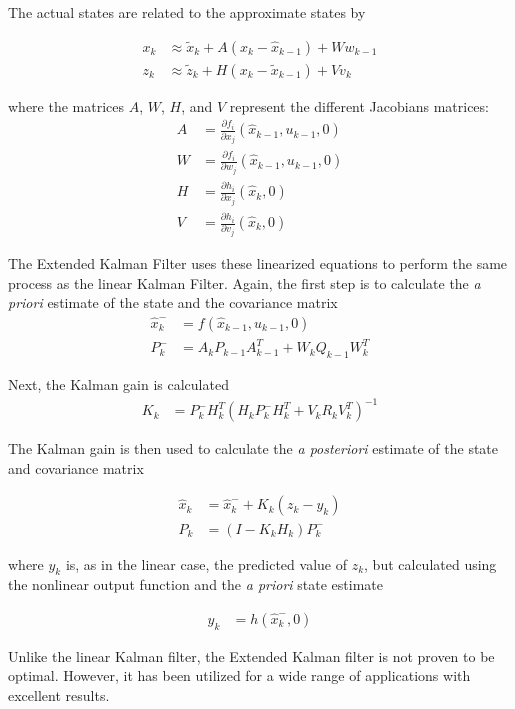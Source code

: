 \documentclass[12pt]{ucthesis}
\begin{document}
The actual states are related to the approximate states by

\begin{align}
x_k &\approx\tilde{x}_k+A(x_k-\hat{x}_{k-1})+Ww_{k-1}\\
z_k &\approx\tilde{z}_k+H(x_k-\tilde{x}_{k-1})+Vv_k
\end{align}

where  the matrices $A$, $W$, $H$, and $V$ represent the different Jacobians matrices:
\begin{align}
A &= \frac{\partial f_i}{\partial x_j}(\hat{x}_{k-1},u_{k-1},0)\\
W &= \frac{\partial f_i}{\partial w_j}(\hat{x}_{k-1},u_{k-1},0)\\
H &= \frac{\partial h_i}{\partial x_j}(\hat{x}_{k},0)\\
V &= \frac{\partial h_i}{\partial v_j}(\hat{x}_{k},0)
\end{align}

The Extended Kalman Filter uses these linearized equations to perform the same process as the linear Kalman Filter. Again, the first step is to calculate the \textit{a priori} estimate of the state and the covariance matrix
\begin{align}
\hat{x}^-_k &=f(\hat{x}_{k-1},u_{k-1},0)\\
P^-_k  &= A_kP_{k-1}A^T_{k-1}+W_kQ_{k-1}W^T_k
\end{align}

Next, the Kalman gain is calculated
\begin{align}
K_k &=P^-_kH^T_k(H_kP^-_kH^T_k+V_kR_kV^T_k)^{-1}
\end{align}

The Kalman gain is then used to calculate the \textit{a posteriori} estimate of the state and covariance matrix

\begin{align}
\hat{x}_k &=\hat{x}^-_{k}+K_k(z_k-y_k)\\
\label{kalmanVariance}
P_k &=(I-K_kH_k)P^-_k
\end{align}

where $y_k$ is, as in the linear case, the predicted value of $z_k$, but calculated using the nonlinear output function and the \textit{a priori} state estimate

\begin{align}
y_k &= h(\hat{x}^-_k,0)
\end{align}

Unlike the linear Kalman filter, the Extended Kalman filter is not proven to be optimal. However, it has been utilized for a wide range of applications with excellent results.
\end{document}
